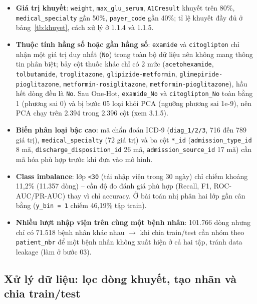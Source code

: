 \documentclass[a4paper]{report}
\begin{document}
\begin{itemize}
  \item \textbf{Giá trị khuyết}: \texttt{weight}, \texttt{max\_\allowbreak{}glu\_\allowbreak{}serum}, \texttt{A1Cresult} khuyết trên 80\%, \texttt{medical\_\allowbreak{}specialty} gần 50\%, \texttt{payer\_\allowbreak{}code} gần 40\%; tỉ lệ khuyết đầy đủ ở bảng~\ref{tb:khuyet}, cách xử lý ở 1.1.4 và 1.1.5.
  \item \textbf{Thuộc tính hằng số hoặc gần hằng số}: \texttt{examide} và \texttt{citoglipton} chỉ nhận một giá trị duy nhất (\texttt{No}) trong toàn bộ dữ liệu nên không mang thông tin phân biệt; bảy cột thuốc khác chỉ có 2 mức (\texttt{acetohexamide}, \texttt{tolbutamide}, \texttt{troglitazone}, \texttt{glipizide-\allowbreak{}metformin}, \texttt{glimepiride-\allowbreak{}pioglitazone}, \texttt{metformin-\allowbreak{}rosiglitazone}, \texttt{metformin-\allowbreak{}pioglitazone}), hầu hết dòng đều là \texttt{No}. Sau One-Hot, \texttt{examide\_\allowbreak{}No} và \texttt{citoglipton\_\allowbreak{}No} toàn bằng 1 (phương sai 0) và bị bước 05 loại khỏi PCA (ngưỡng phương sai 1e-9), nên PCA chạy trên 2.394 trong 2.396 cột (xem 3.1.5).
  \item \textbf{Biến phân loại bậc cao}: mã chẩn đoán ICD-9 (\texttt{diag\_\allowbreak{}1/\allowbreak{}2/\allowbreak{}3}, 716 đến 789 giá trị), \texttt{medical\_\allowbreak{}specialty} (72 giá trị) và ba cột \texttt{*\_\allowbreak{}id} (\texttt{admission\_\allowbreak{}type\_\allowbreak{}id} 8 mã, \texttt{discharge\_\allowbreak{}disposition\_\allowbreak{}id} 26 mã, \texttt{admission\_\allowbreak{}source\_\allowbreak{}id} 17 mã) cần mã hóa phù hợp trước khi đưa vào mô hình.
  \item \textbf{Class imbalance}: lớp \texttt{<30} (tái nhập viện trong 30 ngày) chỉ chiếm khoảng 11,2\% (11.357 dòng) – cần độ đo đánh giá phù hợp (Recall, F1, ROC-AUC/PR-AUC) thay vì chỉ accuracy. Ở bài toán nhị phân hai lớp gần cân bằng (\texttt{y\_\allowbreak{}bin = 1} chiếm 46,19\% tập train).
  \item \textbf{Nhiều lượt nhập viện trên cùng một bệnh nhân}: 101.766 dòng nhưng chỉ có 71.518 bệnh nhân khác nhau $\rightarrow$ khi chia train/test cần nhóm theo \texttt{patient\_\allowbreak{}nbr} để một bệnh nhân không xuất hiện ở cả hai tập, tránh data leakage (làm ở bước 03).
\end{itemize}

\subsection{Xử lý dữ liệu: lọc dòng khuyết, tạo nhãn và chia train/test}
\end{document}
